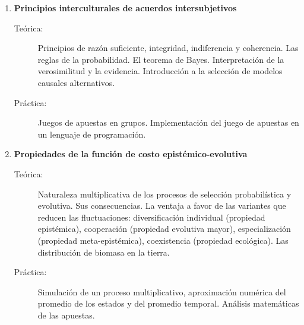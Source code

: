 \documentclass[10pt]{article}
\begin{document}
\begin{enumerate}

\item \textbf{Principios interculturales de acuerdos intersubjetivos}
\vspace{-0.15cm}
\begin{description}
\item[Teórica:] Principios de razón suficiente, integridad, indiferencia y coherencia. Las reglas de la probabilidad. El teorema de Bayes. Interpretación de la verosimilitud y la evidencia. Introducción a la selección de modelos causales alternativos.
\item[Práctica:] Juegos de apuestas en grupos. Implementación del juego de apuestas en un lenguaje de programación.
\end{description}

\vspace{0.1cm}
\item \textbf{Propiedades de la función de costo epistémico-evolutiva}
\vspace{-0.15cm}
\begin{description}
\item[Teórica:] Naturaleza multiplicativa de los procesos de selección probabilística y evolutiva. Sus consecuencias. La ventaja a favor de las variantes que reducen las fluctuaciones: diversificación individual (propiedad epistémica), cooperación (propiedad evolutiva mayor), especialización (propiedad meta-epistémica), coexistencia (propiedad ecológica). Las distribución de biomasa en la tierra.
\item[Práctica:] Simulación de un proceso multiplicativo, aproximación numérica del promedio de los estados y del promedio temporal. Análisis matemáticas de las apuestas.
\end{description}



\end{enumerate}
\end{document}
